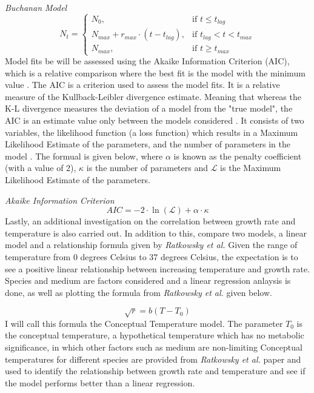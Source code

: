 \textit{Buchanan Model}
\begin{equation*}
    N_t = \begin{cases}
          N_0, & \text{if } t\leq t_{lag}\\
          N_{max} + r_{max} \cdot (t - t_{lag}), & \text{if } t_{lag} < t < t_{max}\\
          N_{max}, & \text{if } t\geq t_{max}
          \end{cases} \label{eq:Buchanan Model} \tag{1.4}
\end{equation*}
Model fits be will be assessed using the Akaike Information Criterion (AIC), which is a relative comparison where the best fit is the model with the minimum value \cite{vrieze2012model, posada2004model}. The AIC is a criterion used to assess the model fits. It is a relative measure of the Kullback-Leibler divergence estimate. Meaning that whereas the K-L divergence measures the deviation of a model from the "true model", the AIC is an estimate value only between the models considered \cite{vrieze2012model}. It consists of two variables, the likelihood function (a loss function) which results in a Maximum Likelihood Estimate of the parameters, and the number of parameters in the model \cite{vrieze2012model}. The formual is given below, where $\alpha$ is known as the penalty coefficient (with a value of 2), $\kappa$ is the number of parameters and $\mathcal{L}$ is the Maximum Likelihood Estimate of the parameters.

\textit{Akaike Information Criterion}
\begin{equation*}
    AIC = -2 \cdot \ln{(\mathcal{L})} + \alpha \cdot \kappa \label{eq:AIC} \tag{2}
\end{equation*}
Lastly, an additional investigation on the correlation between growth rate and temperature is also carried out. In addition to this, compare two models, a linear model and a relationship formula given by \textit{Ratkowsky et al.} Given the range of temperature from 0 degrees Celsius to 37 degrees Celsius, the expectation is to see a positive linear relationship between increasing temperature and growth rate. Species and medium are factors considered and a linear regression anlaysis is done, as well as plotting the formula from \textit{Ratkowsky et al.} given below.

\begin{equation*}
    \sqrt{r}=b(T-T_0) \label{eq:Conceptual Temperature model} \tag{3}
\end{equation*}
I will call this formula the Conceptual Temperature model. The parameter $T_0$ is the conceptual temperature, a hypothetical temperature which has no metabolic significance, in which other factors such as medium are non-limiting \cite{ratkowsky1982relationship} Conceptual temperatures for different species are provided from \textit{Ratkowsky et al.} paper and used to identify the relationship between growth rate and temperature and see if the model performs better than a linear regression.
